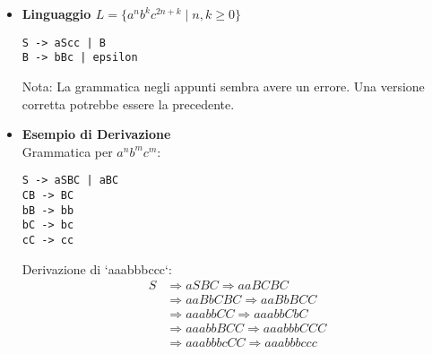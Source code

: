 \begin{itemize}
    \item \textbf{Linguaggio $L = \{a^n b^k c^{2n+k} \mid n,k \ge 0\}$}
    \begin{Verbatim}[frame=single]
S -> aScc | B
B -> bBc | epsilon
    \end{Verbatim}
    Nota: La grammatica negli appunti sembra avere un errore. Una versione corretta potrebbe essere la precedente.

    \item \textbf{Esempio di Derivazione} \\
    Grammatica per $a^n b^m c^m$:
    \begin{Verbatim}[frame=single]
S -> aSBC | aBC
CB -> BC
bB -> bb
bC -> bc
cC -> cc
    \end{Verbatim}
    Derivazione di `aaabbbccc`:
    \begin{align*}
    S & \Rightarrow aSBC \Rightarrow aaBCBC \\
      & \Rightarrow aaBbCBC \Rightarrow aaBbBCC \\
      & \Rightarrow aaabbCC \Rightarrow aaabbCbC \\
      & \Rightarrow aaabbBCC \Rightarrow aaabbbCCC \\
      & \Rightarrow aaabbbcCC \Rightarrow aaabbbccc
    \end{align*}

\end{itemize}

